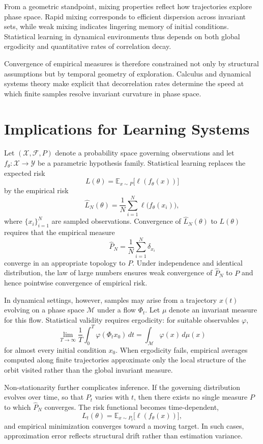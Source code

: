 \documentclass[12pt]{book}
\begin{document}
From a geometric standpoint, mixing properties reflect how trajectories explore phase space. Rapid mixing corresponds to efficient dispersion across invariant sets, while weak mixing indicates lingering memory of initial conditions. Statistical learning in dynamical environments thus depends on both global ergodicity and quantitative rates of correlation decay.

Convergence of empirical measures is therefore constrained not only by structural assumptions but by temporal geometry of exploration. Calculus and dynamical systems theory make explicit that decorrelation rates determine the speed at which finite samples resolve invariant curvature in phase space.

\section{Implications for Learning Systems}

Let $(\mathcal{X},\mathcal{F},P)$ denote a probability space governing observations and let $f_\theta : \mathcal{X} \to \mathcal{Y}$ be a parametric hypothesis family. Statistical learning replaces the expected risk
\[
L(\theta)
=
\mathbb{E}_{x \sim P}
\big[ \ell(f_\theta(x)) \big]
\]
by the empirical risk
\[
\hat{L}_N(\theta)
=
\frac{1}{N}
\sum_{i=1}^N
\ell\big(f_\theta(x_i)\big),
\]
where $\{x_i\}_{i=1}^N$ are sampled observations. Convergence of $\hat{L}_N(\theta)$ to $L(\theta)$ requires that the empirical measure
\[
\hat{P}_N
=
\frac{1}{N}
\sum_{i=1}^N
\delta_{x_i}
\]
converge in an appropriate topology to $P$. Under independence and identical distribution, the law of large numbers ensures weak convergence of $\hat{P}_N$ to $P$ and hence pointwise convergence of empirical risk.

In dynamical settings, however, samples may arise from a trajectory $x(t)$ evolving on a phase space $\mathcal{M}$ under a flow $\Phi_t$. Let $\mu$ denote an invariant measure for this flow. Statistical validity requires ergodicity: for suitable observables $\varphi$,
\[
\lim_{T\to\infty}
\frac{1}{T}
\int_0^T
\varphi(\Phi_t x_0)\, dt
=
\int_{\mathcal{M}}
\varphi(x)\, d\mu(x)
\]
for almost every initial condition $x_0$. When ergodicity fails, empirical averages computed along finite trajectories approximate only the local structure of the orbit visited rather than the global invariant measure.

Non-stationarity further complicates inference. If the governing distribution evolves over time, so that $P_t$ varies with $t$, then there exists no single measure $P$ to which $\hat{P}_N$ converges. The risk functional becomes time-dependent,
\[
L_t(\theta)
=
\mathbb{E}_{x \sim P_t}
\big[ \ell(f_\theta(x)) \big],
\]
and empirical minimization converges toward a moving target. In such cases, approximation error reflects structural drift rather than estimation variance.
\end{document}
